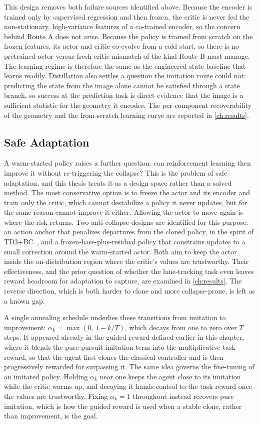 This design removes both failure sources identified above. Because the encoder is trained only by supervised regression and then frozen, the critic is never fed the non-stationary, high-variance features of a co-trained encoder, so the concern behind Route A does not arise. Because the policy is trained from scratch on the frozen features, its actor and critic co-evolve from a cold start, so there is no pretrained-actor-versus-fresh-critic mismatch of the kind Route B must manage. The learning regime is therefore the same as the engineered-state baseline that learns readily. Distillation also settles a question the imitation route could not: predicting the state from the image alone cannot be satisfied through a state branch, so success at the prediction task is direct evidence that the image is a sufficient statistic for the geometry it encodes. The per-component recoverability of the geometry and the from-scratch learning curve are reported in \cref{ch:results}.

\subsection{Safe Adaptation}

A warm-started policy raises a further question: can reinforcement learning then improve it without re-triggering the collapse? This is the problem of safe adaptation, and this thesis treats it as a design space rather than a solved method. The most conservative option is to freeze the actor and its encoder and train only the critic, which cannot destabilize a policy it never updates, but for the same reason cannot improve it either. Allowing the actor to move again is where the risk returns. Two anti-collapse designs are identified for this purpose: an action anchor that penalizes departures from the cloned policy, in the spirit of TD3+BC~\cite{fujimoto2021td3bc}, and a frozen-base-plus-residual policy that constrains updates to a small correction around the warm-started actor. Both aim to keep the actor inside the on-distribution region where the critic's values are trustworthy. Their effectiveness, and the prior question of whether the lane-tracking task even leaves reward headroom for adaptation to capture, are examined in \cref{ch:results}. The reverse direction, which is both harder to clone and more collapse-prone, is left as a known gap.

A single annealing schedule underlies these transitions from imitation to improvement: $\alpha_k = \max(0,\, 1 - k/T)$, which decays from one to zero over $T$ steps. It appeared already in the guided reward defined earlier in this chapter, where it blends the pure-pursuit imitation term into the multiplicative task reward, so that the agent first clones the classical controller and is then progressively rewarded for surpassing it. The same idea governs the fine-tuning of an imitated policy. Holding $\alpha_k$ near one keeps the agent close to its imitation while the critic warms up, and decaying it hands control to the task reward once the values are trustworthy. Fixing $\alpha_k = 1$ throughout instead recovers pure imitation, which is how the guided reward is used when a stable clone, rather than improvement, is the goal.

